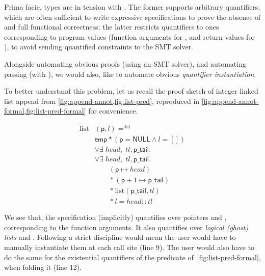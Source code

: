 Prima facie,  types are in tension with .
The former supports arbitrary quantifiers, which are often sufficient to write
expressive specifications to prove the absence of  and full functional
correctness; the latter restricts quantifiers to ones corresponding to program
values (function arguments for \sm{\forall}, and return values for \sm{\exists}), to
avoid sending quantified constraints to the SMT solver.

Alongside automating obvious proofs (using an SMT solver), and automating
 passing (with ), we would also,
like to automate obvious \emph{quantifier instantiation}.

To better understand this problem, let us recall the 
proof sketch of integer linked list append from
\cref{fig:append-annot,fig:list-pred}, reproduced in
\cref{fig:append-annot-formal,fig:list-pred-formal} for convenience.

\begin{marginfigure}
    \small%
    \centering
    \begin{align*}
        \mathrm{list} &(\mathsf{p}, l) \mathrel{{=}^\mathrm{def}} \\
                      &\mathsf{emp} \ast (\mathsf{p} = \mathsf{NULL} \wedge l = []) \\
                      &\vee \exists \; {head}, \; {tl}, \mathsf{p\_tail}.\\
                      &\vee \exists \; {head}, \; {tl}, \mathsf{p\_tail}.\\
                      &\qquad (\mathsf{p} \mapsto {head}) \\
                      &\qquad \ast (\mathsf{p} + 1 \mapsto \mathsf{p\_tail}) \\
                      &\qquad \ast \mathrm{list} (\mathsf{p\_tail}, {tl}) \\
                      &\qquad \ast l = {head} {:}{:} {tl}
    \end{align*}%
    \caption{Definition of a recursive list predicate in a simple separation
        logic.}\label{fig:list-pred-formal}
\end{marginfigure}

We see that, the specification (implicitly) quantifies over pointers
 and , corresponding to the function arguments. It
also quantifies over \emph{logical (ghost) lists}  and .
Following a strict  discipline would mean the user would have
to manually instantiate them at each call site (line 9). The user would also
have to do the same for the existential quantifiers of the 
predicate of~\cref{fig:list-pred-formal}, when folding it (line 12).

